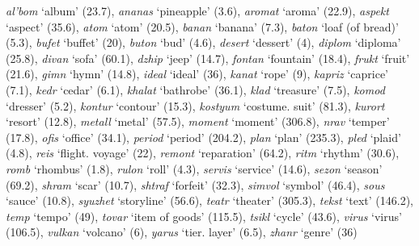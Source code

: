 \documentclass[output=paper, modfonts,newtxmath,hidelinks]{langscibook}
\begin{document}
\noindent\textit{al'bom} `album' (23.7),
\textit{ananas} `pineapple' (3.6),
\textit{aromat} `aroma' (22.9),
\textit{aspekt} `aspect' (35.6),
\textit{atom} `atom' (20.5),
\textit{banan} `banana' (7.3),
\textit{baton} `loaf (of bread)' (5.3),
\textit{bufet} `buffet' (20),
\textit{buton} `bud' (4.6),
\textit{desert} `dessert' (4),
\textit{diplom} `diploma' (25.8),
\textit{divan} `sofa' (60.1),
\textit{dzhip} `jeep' (14.7),
\textit{fontan} `fountain' (18.4),
\textit{frukt} `fruit' (21.6),
\textit{gimn} `hymn' (14.8),
\textit{ideal} `ideal' (36),
\textit{kanat} `rope' (9),
\textit{kapriz} `caprice' (7.1),
\textit{kedr} `cedar' (6.1),
\textit{khalat} `bathrobe' (36.1),
\textit{klad} `treasure' (7.5),
\textit{komod} `dresser' (5.2),
\textit{kontur} `contour' (15.3),
\textit{kostyum} `costume. suit' (81.3),
\textit{kurort} `resort' (12.8),
\textit{metall} `metal' (57.5),
\textit{moment} `moment' (306.8),
\textit{nrav} `temper' (17.8),
\textit{ofis} `office' (34.1),
\textit{period} `period' (204.2),
\textit{plan} `plan' (235.3),
\textit{pled} `plaid' (4.8),
\textit{reis} `flight. voyage' (22),
\textit{remont} `reparation' (64.2),
\textit{ritm} `rhythm' (30.6),
\textit{romb} `rhombus' (1.8),
\textit{rulon} `roll' (4.3),
\textit{servis} `service' (14.6),
\textit{sezon} `season' (69.2),
\textit{shram} `scar' (10.7),
\textit{shtraf} `forfeit' (32.3),
\textit{simvol} `symbol' (46.4),
\textit{sous} `sauce' (10.8),
\textit{syuzhet} `storyline' (56.6),
\textit{teatr} `theater' (305.3),
\textit{tekst} `text' (146.2),
\textit{temp} `tempo' (49),
\textit{tovar} `item of goods' (115.5),
\textit{tsikl} `cycle' (43.6),
\textit{virus} `virus' (106.5),
\textit{vulkan} `volcano' (6),
\textit{yarus} `tier. layer' (6.5),
\textit{zhanr} `genre' (36)


  
\end{document}
